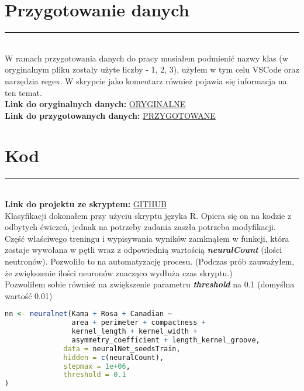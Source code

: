 \documentclass[a4paper,12pt]{article}
\newcommand{\linia}{\rule{\linewidth}{0.5pt}}
\theoremstyle{mytheor}
\begin{document}
\section*{Przygotowanie danych}
\linia\\
 W ramach przygotowania danych do pracy musiałem podmienić nazwy klas (w oryginalnym pliku zostały użyte liczby - 1, 2, 3), użyłem w tym celu VSCode oraz narzędzia regex. W skrypcie jako komentarz również pojawia się informacja na ten temat.\\
 
 \textbf{Link do oryginalnych danych:} \textcolor{red}{\href{https://github.com/bvdzynski/up_ai-lab/blob/master/lab5_project_seeds/data/seeds_dataset_original.txt}{ORYGINALNE}}\\
 
 \textbf{Link do przygotowanych danych:} \textcolor{red}{\href{https://github.com/bvdzynski/up_ai-lab/blob/master/lab5_project_seeds/data/seeds_dataset_changed.data}{PRZYGOTOWANE}}\\
 
\section*{Kod}
\linia\\
\textbf{Link do projektu ze skryptem:} \textcolor{red}{\href{https://github.com/bvdzynski/up_ai-lab/tree/master/lab5_project_seeds}{GITHUB}}\\

Klasyfikacji dokonałem przy użyciu skryptu języka R.
Opiera się on na kodzie z odbytych ćwiczeń, jednak na potrzeby zadania zaszła potrzeba modyfikacji.\\

Część właściwego treningu i wypisywania wyników zamknąłem w funkcji, która zostaje wywołana w pętli wraz z odpowiednią wartością \textbf{\emph{neuralCount}} (ilości neutronów). Pozwoliło to na automatyzację procesu. (Podczas prób zauważyłem, że zwiększenie ilości neuronów znacząco wydłuża czas skryptu.)\\

Pozwoliłem sobie również na zwiększenie parametru \textbf{\emph{threshold}} na 0.1 (domyślna wartość 0.01)

\begin{lstlisting}[language=R]
nn <- neuralnet(Kama + Rosa + Canadian ~
                area + perimeter + compactness + 
                kernel_length + kernel_width + 
                asymmetry_coefficient + length_kernel_groove,
              data = neuralNet_seedsTrain,
              hidden = c(neuralCount),
              stepmax = 1e+06,
              threshold = 0.1
)
\end{lstlisting}
\end{document}
